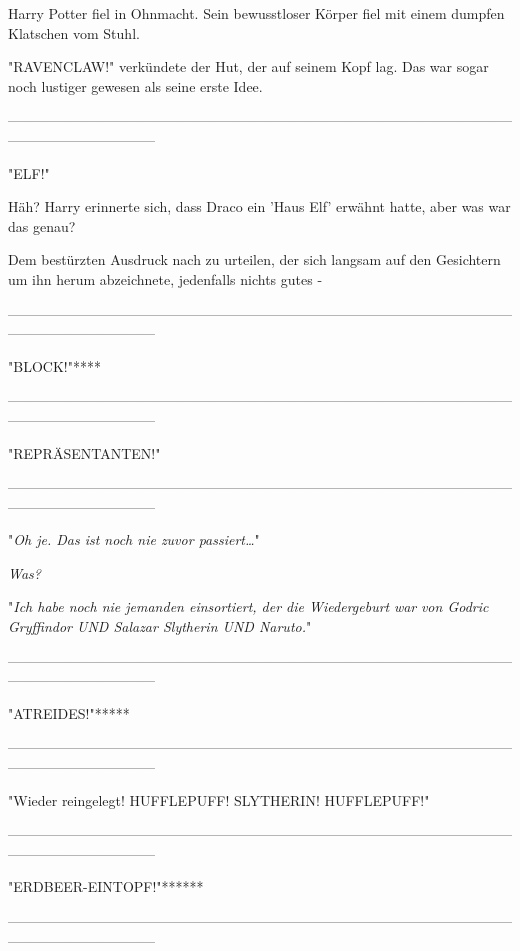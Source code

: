{Harry Potter fiel in Ohnmacht. Sein bewusstloser Körper fiel mit einem dumpfen Klatschen vom Stuhl.

"RAVENCLAW!" verkündete der Hut, der auf seinem Kopf lag. Das war sogar noch lustiger gewesen als seine erste Idee.

--------------------------------------------------------------------------------------------------------------------------------------------

"ELF!"

Häh? Harry erinnerte sich, dass Draco ein 'Haus Elf' erwähnt hatte, aber was war das genau?

Dem bestürzten Ausdruck nach zu urteilen, der sich langsam auf den Gesichtern um ihn herum abzeichnete, jedenfalls nichts gutes -

--------------------------------------------------------------------------------------------------------------------------------------------

"BLOCK!"****

--------------------------------------------------------------------------------------------------------------------------------------------

"REPRÄSENTANTEN!"

--------------------------------------------------------------------------------------------------------------------------------------------

"\emph{Oh je. Das ist noch nie zuvor passiert…}"

\emph{Was?}

"\emph{Ich habe noch nie jemanden einsortiert, der die Wiedergeburt} \emph{war} \emph{von Godric Gryffindor UND Salazar Slytherin UND Naruto.}"

--------------------------------------------------------------------------------------------------------------------------------------------

"ATREIDES!"*****

--------------------------------------------------------------------------------------------------------------------------------------------

"Wieder reingelegt! HUFFLEPUFF! SLYTHERIN! HUFFLEPUFF!"

--------------------------------------------------------------------------------------------------------------------------------------------

"ERDBEER-EINTOPF!"******

--------------------------------------------------------------------------------------------------------------------------------------------

}
